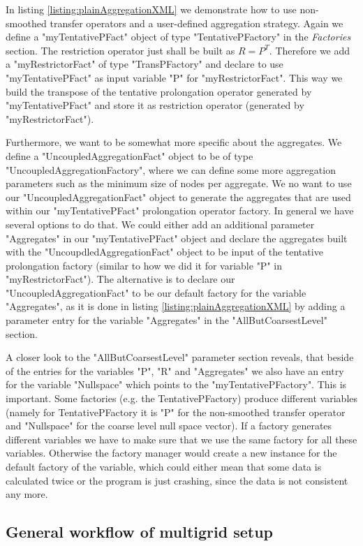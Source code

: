 In listing \ref{listing:plainAggregationXML} we demonstrate how to use non-smoothed transfer operators and a user-defined aggregation strategy. Again we define a "myTentativePFact" object of type "TentativePFactory" in the \textit{Factories} section. The restriction operator just shall be built as $R=P^T$. Therefore we add a "myRestrictorFact" of type "TransPFactory" and declare to use "myTentativePFact" as input variable "P" for "myRestrictorFact". This way we build the transpose of the tentative prolongation operator generated by "myTentativePFact" and store it as restriction operator (generated by "myRestrictorFact").

Furthermore, we want to be somewhat more specific about the aggregates. We define a "UncoupledAggregationFact" object to be of type "UncoupledAggregationFactory", where we can define some more aggregation parameters such as the minimum size of nodes per aggregate. We no want to use our "UncoupledAggregationFact" object to generate the aggregates that are used within our "myTentativePFact" prolongation operator factory. In general we have several options to do that. We could either add an additional parameter "Aggregates" in our "myTentativePFact" object and declare the aggregates built with the "UncoupdledAggregationFact" object to be input of the tentative prolongation factory (similar to how we did it for variable "P" in "myRestrictorFact"). The alternative is to declare our "UncoupledAggregationFact" to be our default factory for the variable "Aggregates", as it is done in listing \ref{listing:plainAggregationXML} by adding a parameter entry for the variable "Aggregates" in the "AllButCoarsestLevel" section.

A closer look to the "AllButCoarsestLevel" parameter section reveals, that beside of the entries for the variables "P", "R" and "Aggregates" we also have an entry for the variable "Nullspace" which points to the "myTentativePFactory". This is important. Some factories (e.g. the TentativePFactory) produce different variables (namely for TentativePFactory it is "P" for the non-smoothed transfer operator and "Nullspace" for the coarse level null space vector). If a factory generates different variables we have to make sure that we use the same factory for all these variables. Otherwise the factory manager would create a new instance for the default factory of the variable, which could either mean that some data is calculated twice or the program is just crashing, since the data is not consistent any more.

\subsection{General workflow of multigrid setup}

